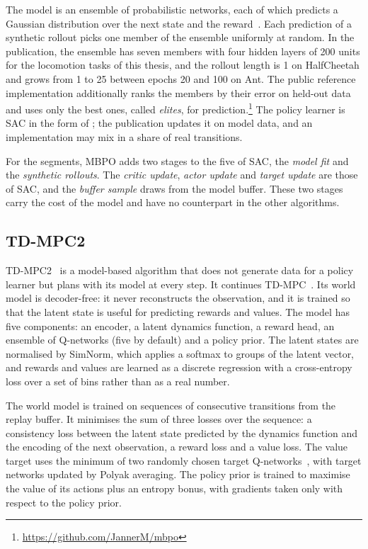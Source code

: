 The model is an ensemble of probabilistic networks, each of which predicts a Gaussian distribution over the next state and the reward~\cite{chua2018pets}.
Each prediction of a synthetic rollout picks one member of the ensemble uniformly at random.
In the publication, the ensemble has seven members with four hidden layers of \num{200} units for the locomotion tasks of this thesis, and the rollout length is \num{1} on HalfCheetah and grows from \num{1} to \num{25} between epochs \num{20} and \num{100} on Ant.
The public reference implementation additionally ranks the members by their error on held-out data and uses only the best ones, called \emph{elites}, for prediction.\footnote{\url{https://github.com/JannerM/mbpo}}
The policy learner is SAC in the form of ; the publication updates it on model data, and an implementation may mix in a share of real transitions.

For the segments, MBPO adds two stages to the five of SAC, the \emph{model fit} and the \emph{synthetic rollouts}.
The \emph{critic update}, \emph{actor update} and \emph{target update} are those of SAC, and the \emph{buffer sample} draws from the model buffer.
These two stages carry the cost of the model and have no counterpart in the other algorithms.

\subsection{TD-MPC2}\label{sec:algo-tdmpc2}

TD-MPC2~\cite{hansen2024tdmpc2} is a model-based algorithm that does not generate data for a policy learner but plans with its model at every step.
It continues TD-MPC~\cite{hansen2022tdmpc}.
Its world model is decoder-free: it never reconstructs the observation, and it is trained so that the latent state is useful for predicting rewards and values.
The model has five components: an encoder, a latent dynamics function, a reward head, an ensemble of Q-networks (five by default) and a policy prior.
The latent states are normalised by SimNorm, which applies a softmax to groups of the latent vector, and rewards and values are learned as a discrete regression with a cross-entropy loss over a set of bins rather than as a real number.

The world model is trained on sequences of consecutive transitions from the replay buffer.
It minimises the sum of three losses over the sequence: a consistency loss between the latent state predicted by the dynamics function and the encoding of the next observation, a reward loss and a value loss.
The value target uses the minimum of two randomly chosen target Q-networks~\cite{chen2021redq}, with target networks updated by Polyak averaging.
The policy prior is trained to maximise the value of its actions plus an entropy bonus, with gradients taken only with respect to the policy prior.

